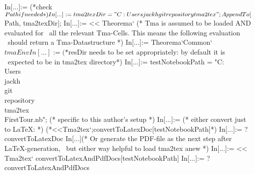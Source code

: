 \begin{program}
\caption{This code is also contained in the project file (tma2tex/)tma2tex.nb and shows how to perform a Theorema notebook to \LaTeX- and PDF-conversion. "In[...]:=" prefixes a new cell in this case.}
\label{tma2texFullSample}
\begin{LaTeXCode}
In[...]:= (*check $Path if needed*)
In[...]:= tma2texDir = "C:\\Users\\jackh\\git\\repository\\tma2tex";
AppendTo[$Path, tma2texDir];
In[...]:= << Theorema` (* Tma is assumed to be loaded AND evaluated for \
all the relevant Tma-Cells. This means the following evaluation \
should return a Tma-Datastructure *)
In[...]:= Theorema`Common`$tmaEnv
In[...]:= (*$resDir needs to be set appropriately: by default it is \
expected to be in tma2tex directory*)
In[...]:= testNotebookPath = 
  "C:\\Users\\jackh\\git\\repository\\tma2tex\\FirstTour.nb"; (* specific to this author's setup *)
In[...]:= (* either convert just to LaTeX: *)
(*<<Tma2tex`;convertToLatexDoc[testNotebookPath]*)
In[...]:= ?convertToLatexDoc
In[...](* Or generate the PDF-file as the next step after LaTeX-generation, \
but either way helpful to load tma2tex anew *)
In[...]:= << Tma2tex`
convertToLatexAndPdfDocs[testNotebookPath]
In[...]:= ?convertToLatexAndPdfDocs
\end{LaTeXCode}
\end{program}